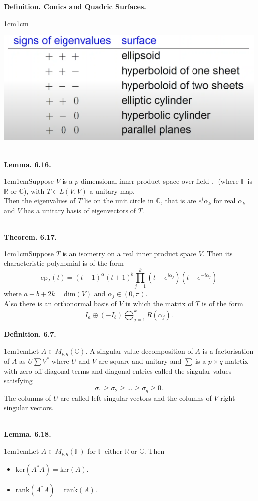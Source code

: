 \documentclass{article}
\newcommand{\definition}[2]{\textbf{Definition. #1.}\begin{adjustwidth}{1cm}{1cm}#2\end{adjustwidth}}
\newcommand{\theorem}[2]{\textbf{Theorem. #1.}\begin{adjustwidth}{1cm}{1cm}#2\end{adjustwidth}}
\newcommand{\lemma}[2]{\textbf{Lemma. #1.}\begin{adjustwidth}{1cm}{1cm}#2\end{adjustwidth}}
\begin{document}
\definition{Conics and Quadric Surfaces}{\vspace{1cm}
\begin{center}
  \includegraphics[scale=0.45]{assets/6_5_1.PNG}
\end{center}}~\\
\lemma{6.16}{Suppose $V$ is a $p$-dimensional inner product space over field $\mathbb{F}$ (where $\mathbb{F}$ is $\mathbb{R}$ or $\mathbb{C}$), with $T \in L(V,V)$ a unitary map.\\Then the eigenvalues of $T$ lie on the unit circle in $\mathbb{C}$, that is are $e^i \alpha_k$ for real $\alpha_k$ and $V$ has a unitary basis of eigenvectors of $T$.}~\\
\theorem{6.17}{Suppose $T$ is an isometry on a real inner product space $V$. Then its characteristic polynomial is of the form \[\text{cp}_T(t) = (t-1)^\alpha (t+1)^b \prod_{j=1}^k (t-e^{i \alpha_j})(t-e^{-i \alpha_j})\]where $a + b + 2k = \text{dim}(V)$ and $\alpha_j \in (0, \pi)$.\\Also there is an orthonormal basis of $V$ in which the matrix of $T$ is of the form \[I_a \oplus (-I_b) \bigoplus_{j=1}^k R(\alpha_j).\]}\newpage
\definition{6.7}{Let $A \in M_{p,q}(\mathbb{C})$. A singular value decomposition of $A$ is a factorisation of $A$ as $U \sum V^*$ where $U$ and $V$ are square and unitary and $\sum$ is a $p \times q$ matrtix with zero off diagonal terms and diagonal entries called the singular values satisfying \[\sigma_1 \geq \sigma_2 \geq \ldots \geq \sigma_q \geq 0.\]The columns of $U$ are called left singular vectors and the columns of $V$ right singular vectors.}~\\
\lemma{6.18}{Let $A \in M_{p,q}(\mathbb{F})$ for $\mathbb{F}$ either $\mathbb{R}$ or $\mathbb{C}$. Then
\begin{itemize}
  \item $\text{ker}(A^*A) = \text{ker}(A)$.
  \item $\text{rank}(A^*A) = \text{rank}(A)$.
\end{itemize}}~\\
\end{document}

